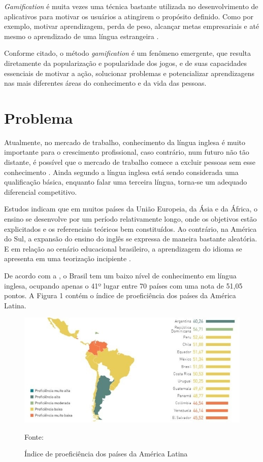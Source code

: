 \documentclass[
	12pt,				%
	openany,			%
	oneside,			%
	a4paper,			%
	english,			%
	french,				%
	spanish,			%
	brazil				%
	]{abntex2}
\begin{document}
	\textit{Gamification} é muita vezes uma técnica bastante utilizada no desenvolvimento de aplicativos para motivar os usuários a atingirem o propósito definido. Como por exemplo, motivar aprendizagem, perda de peso, alcançar metas empresariais e até mesmo o aprendizado de uma língua estrangeira \cite{ALVES}.

Conforme citado, o método \textit{gamification} é um fenômeno emergente, que resulta diretamente da popularização e popularidade dos jogos, e de suas capacidades essenciais de motivar a ação, solucionar problemas e potencializar aprendizagens nas mais diferentes áreas do conhecimento e da vida das pessoas.
	


\section{Problema}
Atualmente, no mercado de trabalho, conhecimento da língua inglesa é muito importante para o crescimento profissional, caso contrário, num futuro não tão distante, é possível que o mercado de trabalho comece a excluir pessoas sem esse conhecimento \cite{CABRAL}. Ainda segundo  a língua inglesa está sendo considerada uma qualificação básica, enquanto falar uma terceira língua, torna-se um adequado diferencial competitivo. 

Estudos indicam que em muitos países da União Europeia, da Ásia e da África, o ensino se desenvolve por um período relativamente longo, onde os objetivos estão explicitados e os referenciais teóricos bem constituídos. Ao contrário, na América do Sul, a expansão do ensino do inglês se expressa de maneira bastante aleatória. E em relação ao cenário educacional brasileiro, a aprendizagem do idioma se apresenta em uma teorização incipiente \cite{ROCHA}.

De acordo com a , o Brasil tem um baixo nível de conhecimento em língua inglesa, ocupando apenas o 41º lugar entre 70 países com uma nota de 51,05 pontos. A Figura 1 contém o índice de proeficiência dos países da América Latina.

\begin{figure}[H]
    \centering
\caption{Índice de proeficiência dos países da América Latina}
\includegraphics[width=16cm]{figuras/proeficiencia.jpg}
\par
 Fonte: \cite{EF}
\end{figure}
\end{document}
